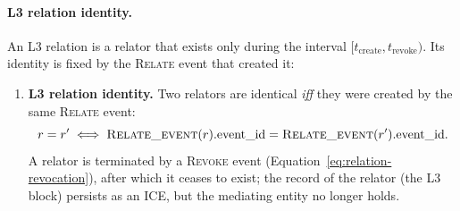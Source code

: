 \paragraph{L3 relation identity.}
An L3 relation is a relator that exists only during the interval $[t_{\text{create}}, t_{\text{revoke}})$. Its identity is fixed by the \textsc{Relate} event that created it:

\begin{enumerate}[label=Axiom I\arabic*:,leftmargin=3em,resume]
    \item \textbf{L3 relation identity.} Two relators are identical \emph{iff} they were created by the same \textsc{Relate} event:
    \begin{equation}\label{eq:i7}
        r = r' \iff \textsc{Relate\_event}(r).\text{event\_id} = \textsc{Relate\_event}(r').\text{event\_id}.
    \end{equation}
    A relator is terminated by a \textsc{Revoke} event (Equation~\ref{eq:relation-revocation}), after which it ceases to exist; the record of the relator (the L3 block) persists as an ICE, but the mediating entity no longer holds.
\end{enumerate}


